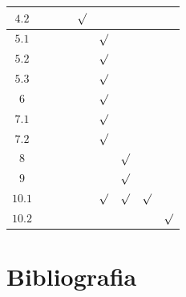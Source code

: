 \documentclass[conference,harvard,brazil,english]{sbatex}
\begin{document}
\begin{table}[!h]
\begin{center}
{\begin{tabular}{c|c|c|c|c|c|c|c|c}
                            $4.2$                                           &         &         &         & $\surd$ &         &         &         &         \\ \hline
                            $5.1$                                           &         &         &         &         & $\surd$ &         &         &         \\ \hline
                            $5.2$                                           &         &         &         &         & $\surd$ &         &         &         \\ \hline
                            $5.3$                                           &         &         &         &         & $\surd$ &         &         &         \\ \hline
                            $6$                                             &         &         &         &         & $\surd$ &         &         &         \\ \hline
                            $7.1$                                           &         &         &         &         & $\surd$ &         &         &         \\ \hline
                            $7.2$                                           &         &         &         &         & $\surd$ &         &         &         \\ \hline
                            $8$                                             &         &         &         &         &         & $\surd$ &         &         \\ \hline
                            $9$                                             &         &         &         &         &         & $\surd$ &         &         \\ \hline
                            $10.1$                                          &         &         &         &         & $\surd$ & $\surd$ & $\surd$ &         \\ \hline
                            $10.2$                                          &         &         &         &         &         &         &         & $\surd$ \\ \hline
                        \end{tabular}
                    }
                \end{center}
            \end{table}
            
            
    \section{Bibliografia}
        
\end{document}
